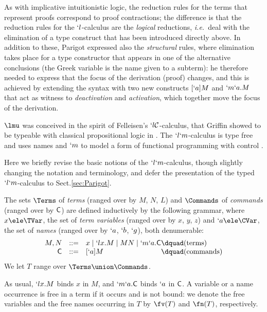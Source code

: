 \documentclass{lmcs}
\def\ie{\emph{i.e.}}
\def\LC{the $`l$-calculus}
\begin{document}
As with implicative intuitionistic logic, the reduction rules for the terms that represent proofs correspond to proof contractions; the difference is that the reduction rules for {\LC} are the \emph{logical} reductions, \ie~deal with the elimination of a type construct that has been introduced directly above. 
In addition to these, Parigot expressed also the \emph{structural} rules, where elimination takes place for a type constructor that appears in one of the alternative conclusions (the Greek variable is the name given to a subterm): he therefore needed to express that the focus of the derivation (proof) changes, and this is achieved by extending the syntax with two new constructs $[`a]M$ and $`m`a.M$ that act as witness to \emph{deactivation} and \emph{activation}, which together move the focus of the derivation.

$\lmu$ was conceived in the spirit of Felleisen's $`l{\mathcal C}$-calculus, that Griffin showed to be typeable with classical propositional logic in \cite{Griffin'90}. 
%
The $`l`m$-calculus is type free and uses names and $`m$ to model a form of functional programming with control \cite{deGroote'94}.

Here we briefly revise the basic notions of the $`l`m$-calculus, though slightly changing the notation and terminology, and defer the presentation of the typed $`l`m$-calculus to Sect.\skp\ref{sec:Parigot}.

 \begin{defi} %
The sets $ \Terms$ of \emph{terms} (ranged over by $M$, $N$, $L$) and $ \Commands$ of \emph{commands} (ranged over by $\textrm{\sf C}$) are defined inductively by the following grammar, where $x \ele \TVar$, the set of \emph{term variables} (ranged over by $x$, $y$, $z$) and $`a \ele \CVar$, the set of \emph{names} (ranged over by $`a$, $`b$, $`g$), both denumerable:
%
%
 \[ \begin{array}{rcl@{\dquad}l}
M,N & :: = &x \mid `lx.M \mid MN \mid `m`a.\Cmd & (\textrm{terms}) \\
 \Cmd & :: = & [`a]M & (\textrm{commands})
 \end{array} \]
We let $T$ range over $\Terms \union \Commands$.

As usual, $`l x.M$ binds $x$ in $M$, and $`m `a .\textrm{\sf C}$ binds $`a $ in $\textrm{\sf C}$. 
A variable or a name occurrence is free in a term if it occurs and is not bound: we denote the free variables and the free names occurring in $T$ by $\fv(T)$ and $\fn(T)$, respectively.
 \end{defi}
\end{document}
